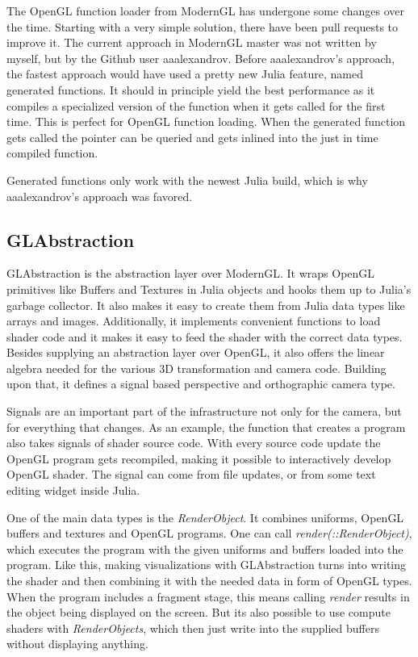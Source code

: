 The OpenGL function loader from ModernGL has undergone some changes over the time.
Starting with a very simple solution, there have been pull requests to improve it.
The current approach in ModernGL master was not written by myself, but by the Github user aaalexandrov\cite{Aaalexandrov}.
Before aaalexandrov’s approach, the fastest approach would have used a pretty new Julia feature, named generated functions.
It should in principle yield the best performance as it compiles a specialized version of the function when it gets called for the first time. This is perfect for \ac{OpenGL} function loading. When the generated function gets called the pointer can be queried and gets inlined into the just in time compiled function.

Generated functions only work with the newest Julia build, which is why aaalexandrov’s approach was favored.


\subsection{GLAbstraction}
GLAbstraction is the abstraction layer over ModernGL.
It wraps \ac{OpenGL} primitives like Buffers and Textures in Julia objects and hooks them up to Julia's garbage collector. It also makes it easy to create them from Julia data types like arrays and images.
Additionally, it implements convenient functions to load shader code and it makes it easy to feed the shader with the correct data types.
Besides supplying an abstraction layer over \ac{OpenGL}, it also offers the linear algebra needed for the various 3D transformation and camera code.
Building upon that, it defines a signal based perspective and orthographic camera type.

Signals are an important part of the infrastructure not only for the camera, but for everything that changes.
As an example, the function that creates a program also takes signals of shader source code. 
With every source code update the OpenGL program gets recompiled, making it possible to interactively develop OpenGL shader. The signal can come from file updates, or from some text editing widget inside Julia.

One of the main data types is the \textit{RenderObject}.
It combines uniforms, OpenGL buffers and textures and OpenGL programs. One can call \textit{render(::RenderObject)}, which executes the program with the given uniforms and buffers loaded into the program. 
Like this, making visualizations with GLAbstraction turns into writing the shader and then combining it with the needed data in form of OpenGL types.
When the program includes a fragment stage, this means calling \textit{render} results in the object being displayed on the screen. But its also possible to use compute shaders with \textit{RenderObjects}, which then just write into the supplied buffers without displaying anything.

